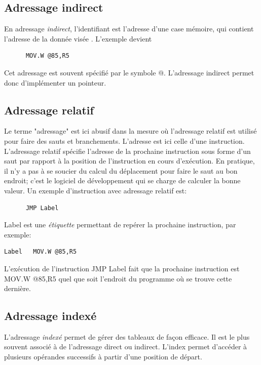 \subsection{Adressage indirect}
En adressage \textit{indirect}, l'identifiant est l'adresse d'une case mémoire, qui contient l'adresse de la donnée visée . L'exemple devient
\lstset{style=customc}
\begin{lstlisting}
      MOV.W @85,R5
\end{lstlisting}
Cet adressage est souvent spécifié par le symbole @. L'adressage indirect permet donc d'implémenter un pointeur.

\subsection{Adressage relatif}
Le terme "adressage" est ici abusif dans la mesure où l'adressage relatif est utilisé pour faire des sauts et branchements. L'adresse est ici celle d'une instruction. L'adressage relatif spécifie l'adresse de la prochaine instruction sous forme d'un saut par rapport à la position de l'instruction en cours d'exécution.
En pratique, il n'y a pas à se soucier du calcul du déplacement pour faire le saut au bon endroit; c'est le logiciel de développement qui se charge de calculer la bonne valeur.
Un exemple d'instruction avec adressage relatif est:
\lstset{style=customc}
\begin{lstlisting}
      JMP Label
\end{lstlisting}

{\selectfont Label} est une \textit{étiquette} permettant de repérer la prochaine instruction, par exemple:
\lstset{style=customc}
\begin{lstlisting}
Label	MOV.W @85,R5
\end{lstlisting}
L'exécution de l'instruction {\selectfont JMP Label} fait que la prochaine instruction est {\selectfont MOV.W @85,R5} quel que soit l'endroit du programme où se trouve cette dernière.

\subsection{Adressage indexé}
L'adressage \textit{indexé} permet de gérer des tableaux de façon efficace. Il est le plus souvent associé à de l'adressage direct ou indirect. L'index permet d'accéder à plusieurs opérandes successifs à partir d'une position de départ.

